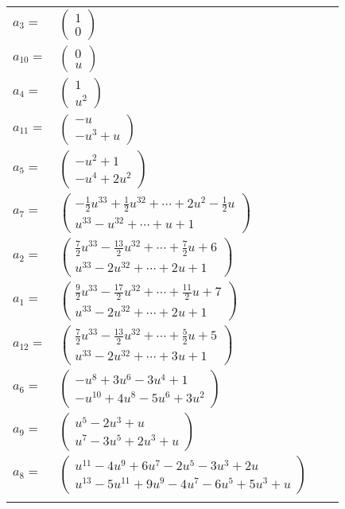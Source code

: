 \documentclass[1p]{elsarticle_modified}
\theoremstyle{definition}
\begin{document}
\begin{tabular}{m{7pt} m{180pt} m{7pt} m{180pt} }
\flushright $a_{3}=$&$\begin{pmatrix}1\\0\end{pmatrix}$ \\
\flushright $a_{10}=$&$\begin{pmatrix}0\\u\end{pmatrix}$ \\
\flushright $a_{4}=$&$\begin{pmatrix}1\\u^2\end{pmatrix}$ \\
\flushright $a_{11}=$&$\begin{pmatrix}- u\\- u^3+u\end{pmatrix}$ \\
\flushright $a_{5}=$&$\begin{pmatrix}- u^2+1\\- u^4+2 u^2\end{pmatrix}$ \\
\flushright $a_{7}=$&$\begin{pmatrix}-\frac{1}{2} u^{33}+\frac{1}{2} u^{32}+\cdots+2 u^2-\frac{1}{2} u\\u^{33}- u^{32}+\cdots+u+1\end{pmatrix}$ \\
\flushright $a_{2}=$&$\begin{pmatrix}\frac{7}{2} u^{33}-\frac{13}{2} u^{32}+\cdots+\frac{7}{2} u+6\\u^{33}-2 u^{32}+\cdots+2 u+1\end{pmatrix}$ \\
\flushright $a_{1}=$&$\begin{pmatrix}\frac{9}{2} u^{33}-\frac{17}{2} u^{32}+\cdots+\frac{11}{2} u+7\\u^{33}-2 u^{32}+\cdots+2 u+1\end{pmatrix}$ \\
\flushright $a_{12}=$&$\begin{pmatrix}\frac{7}{2} u^{33}-\frac{13}{2} u^{32}+\cdots+\frac{5}{2} u+5\\u^{33}-2 u^{32}+\cdots+3 u+1\end{pmatrix}$ \\
\flushright $a_{6}=$&$\begin{pmatrix}- u^8+3 u^6-3 u^4+1\\- u^{10}+4 u^8-5 u^6+3 u^2\end{pmatrix}$ \\
\flushright $a_{9}=$&$\begin{pmatrix}u^5-2 u^3+u\\u^7-3 u^5+2 u^3+u\end{pmatrix}$ \\
\flushright $a_{8}=$&$\begin{pmatrix}u^{11}-4 u^9+6 u^7-2 u^5-3 u^3+2 u\\u^{13}-5 u^{11}+9 u^9-4 u^7-6 u^5+5 u^3+u\end{pmatrix}$\\&\end{tabular}
\end{document}
